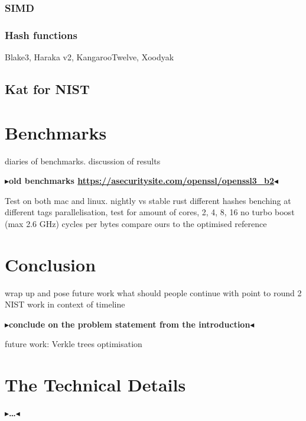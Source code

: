 \documentclass[twoside,11pt]{report}
\theoremstyle{definition}
\theoremstyle{plain}
\newcommand{\todo}[1]{{\color[rgb]{.5,0,0}\textbf{$\blacktriangleright$#1$\blacktriangleleft$}}}
\begin{document}

\subsection{SIMD}\label{sub:simd} %


\subsection{Hash functions}
Blake3, Haraka v2, KangarooTwelve, Xoodyak

\section{Kat for NIST}\label{sub:kat_for_nist} %



\chapter{Benchmarks}\label{ch:bench}
diaries of benchmarks.
discussion of results

\todo{old benchmarks \url{https://asecuritysite.com/openssl/openssl3_b2}}

Test on both mac and linux.
nightly vs stable rust
different hashes
benching at different tags
parallelisation, test for amount of cores, 2, 4, 8, 16
no turbo boost (max 2.6 GHz)
cycles per bytes
compare ours to the optimised reference


\chapter{Conclusion}\label{ch:conclusion}

wrap up and pose future work
what should people continue with
point to round 2 NIST
work in context of timeline

\todo{conclude on the problem statement from the introduction}

future work: Verkle trees optimisation


\cleardoublepage
{}




\cleardoublepage
\appendix
\chapter{The Technical Details}

\todo{\dots}
\end{document}
